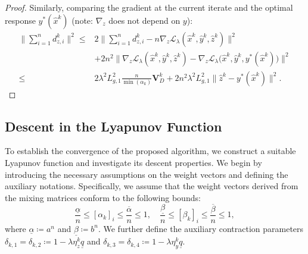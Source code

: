 \documentclass{article}
\theoremstyle{plain}
\theoremstyle{definition}
\theoremstyle{remark}
\begin{document}
\begin{proof}
 Similarly, comparing the gradient at the current iterate and the optimal response $y^*(\hat{x}^k)$ (note: $\nabla_z$ does not depend on $y$):
    \begin{align*}
        \bigg\|\sum_{i=1}^nd_{z,i}^k\bigg\|^{2}
        \leq{}& 2 \bigg\| \sum_{i=1}^nd_{z,i}^k- n \nabla_{z} \mathcal{L}_{\lambda}({\hat{x}}^k, {\hat{y}}^k, {\hat{z}}^k) \bigg\|^{2} \\
        &+ 2n^{2} \big\| \nabla_{z} \mathcal{L}_{\lambda}({\hat{x}}^k, {\hat{y}}^k, {\hat{z}}^k) - \nabla_{z} \mathcal{L}_{\lambda}\big({\hat{x}}^k, {\hat{y}}^k, y^*({\hat{x}}^k)\big) \big\|^{2} \\
        \leq{}& 2 \lambda^{2} L_{g,1}^{2}\frac{n}{\min(\alpha_{k})}\mathbf{V}_{D}^{k} + 2 n^{2}\lambda^{2}L_{g,1}^{2}\big\|\hat{z}^{k}-y^*(\hat{x}^{k})\big\|^{2}.
    \end{align*}
\end{proof}
\subsection{Descent in the Lyapunov Function} 
\label{app:fab_lyapunov}

To establish the convergence of the proposed algorithm, we construct a suitable Lyapunov function and investigate its descent properties. We begin by introducing the necessary assumptions on the weight vectors and defining the auxiliary notations. Specifically, we assume that the weight vectors derived from the mixing matrices conform to the following bounds:
\begin{equation}\label{eq:weight_bounds}
    \frac{\underline{\alpha}}{n} \leq [\alpha_{k}]_{i} \leq \frac{\overline{\alpha}}{n} \leq 1, \quad \frac{\underline{\beta}}{n} \leq [\beta_{k}]_{i} \leq \frac{\overline{\beta}}{n} \leq 1,
\end{equation}
where $\underline{\alpha} \coloneqq a^n$ and $\underline{\beta} \coloneqq b^n$. We further define the auxiliary contraction parameters $\delta_{k,1}=\delta_{k,2} \coloneqq 1-\lambda\eta_{z}^{k}\underline{q}$ and $\delta_{k,3}=\delta_{k,4} \coloneqq 1-\lambda\eta_{y}^{k}\underline{q}$.
\end{document}

